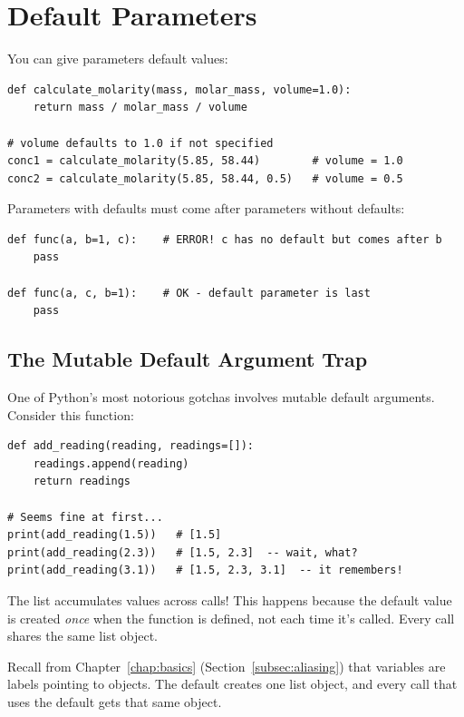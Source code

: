 \section{Default Parameters}
\label{sec:default-params}

You can give parameters default values:

\begin{lstlisting}
def calculate_molarity(mass, molar_mass, volume=1.0):
    return mass / molar_mass / volume

# volume defaults to 1.0 if not specified
conc1 = calculate_molarity(5.85, 58.44)        # volume = 1.0
conc2 = calculate_molarity(5.85, 58.44, 0.5)   # volume = 0.5
\end{lstlisting}

\begin{warning}
Parameters with defaults must come after parameters without defaults:
\begin{lstlisting}
def func(a, b=1, c):    # ERROR! c has no default but comes after b
    pass

def func(a, c, b=1):    # OK - default parameter is last
    pass
\end{lstlisting}
\end{warning}

\subsection{The Mutable Default Argument Trap}
\label{subsec:mutable-defaults}

One of Python's most notorious gotchas involves mutable default arguments. Consider this function:

\begin{lstlisting}
def add_reading(reading, readings=[]):
    readings.append(reading)
    return readings

# Seems fine at first...
print(add_reading(1.5))   # [1.5]
print(add_reading(2.3))   # [1.5, 2.3]  -- wait, what?
print(add_reading(3.1))   # [1.5, 2.3, 3.1]  -- it remembers!
\end{lstlisting}

The list accumulates values across calls! This happens because the default value \py{[]} is created \emph{once} when the function is defined, not each time it's called. Every call shares the same list object.

Recall from Chapter~\ref{chap:basics} (Section~\ref{subsec:aliasing}) that variables are labels pointing to objects. The default \py{[]} creates one list object, and every call that uses the default gets that same object.

